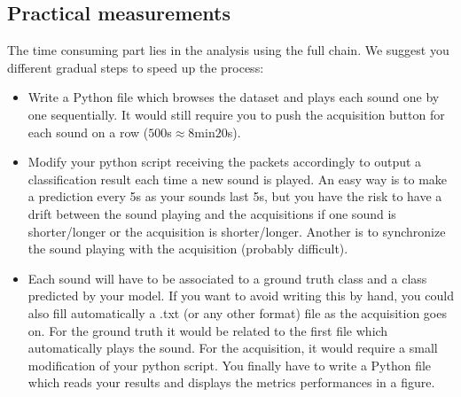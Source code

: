 \subsection{Practical measurements}
%
The time consuming part lies in the analysis using the full chain. We suggest you different gradual steps to speed up the process:
%
\begin{itemize}
    \item Write a Python file which browses the dataset and plays each sound one by one sequentially. It would still require you to push the acquisition button for each sound on a row ($500$s$\approx 8$min$20$s).
    \item Modify your python script receiving the packets accordingly to output a classification result each time a new sound is played.
    An easy way is to make a prediction every 5s as your sounds last 5s, but you have the risk to have a drift between the sound playing and the acquisitions if one sound is shorter/longer or the acquisition is shorter/longer.
    Another is to synchronize the sound playing with the acquisition (probably difficult).
    \item Each sound will have to be associated to a ground truth class and a class predicted by your model. If you want to avoid writing this by hand, you could also fill automatically a .txt (or any other format) file as the acquisition goes on.
    For the ground truth it would be related to the first file which automatically
    plays the sound. For the acquisition, it would require a small modification of your python script.
    You finally have to write a Python file which reads your results and displays the metrics performances in a figure.
\end{itemize}
